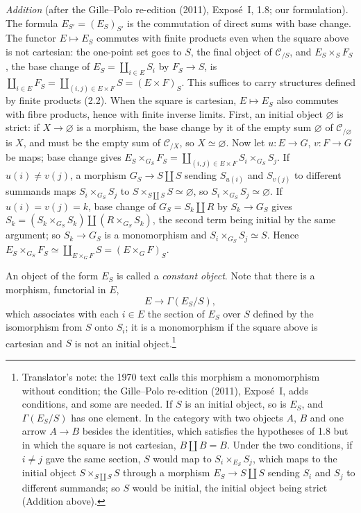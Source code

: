 \par\medskip\noindent
\emph{Addition} (after the Gille--Polo re-edition (2011), Exposé~I, 1.8;
our formulation). The formula \(E_{S'}=(E_S)_{S'}\) is the commutation of
direct sums with base change. The functor \(E\mapsto E_S\) commutes with
finite products even when the square above is not cartesian: the one-point
set goes to \(S\), the final object of \(\mathscr C_{/S}\), and
\(E_S\times_SF_S\), the base change of \(E_S=\coprod_{i\in E}S_i\) by
\(F_S\to S\), is
\(\coprod_{i\in E}F_S=\coprod_{(i,j)\in E\times F}S=(E\times F)_S\). This
suffices to carry structures defined by finite products (2.2). When the
square is cartesian, \(E\mapsto E_S\) also commutes with fibre products,
hence with finite inverse limits. First, an initial object \(\varnothing\)
is strict: if \(X\to\varnothing\) is a morphism, the base change by it of
the empty sum \(\varnothing\) of \(\mathscr C_{/\varnothing}\) is \(X\), and
must be the empty sum of \(\mathscr C_{/X}\), so \(X\simeq\varnothing\).
Now let \(u:E\to G\), \(v:F\to G\) be maps; base change gives
\(E_S\times_{G_S}F_S=\coprod_{(i,j)\in E\times F}S_i\times_{G_S}S_j\). If
\(u(i)\ne v(j)\), a morphism \(G_S\to S\amalg S\) sending \(S_{u(i)}\) and
\(S_{v(j)}\) to different summands maps \(S_i\times_{G_S}S_j\) to
\(S\times_{S\amalg S}S\simeq\varnothing\), so
\(S_i\times_{G_S}S_j\simeq\varnothing\). If \(u(i)=v(j)=k\), base change of
\(G_S=S_k\amalg R\) by \(S_k\to G_S\) gives
\(S_k=(S_k\times_{G_S}S_k)\amalg(R\times_{G_S}S_k)\), the second term being
initial by the same argument; so \(S_k\to G_S\) is a monomorphism and
\(S_i\times_{G_S}S_j\simeq S\). Hence
\(E_S\times_{G_S}F_S\simeq\coprod_{E\times_GF}S=(E\times_GF)_S\).
\par\medskip

An object of the form \(E_S\) is called a \emph{constant object}. Note that
there is a morphism, functorial in \(E\),
\[
  E\longrightarrow\Gamma(E_S/S),
\]
which associates with each \(i\in E\) the section of \(E_S\) over \(S\)
defined by the isomorphism from \(S\) onto \(S_i\); it is a monomorphism if
the square above is cartesian and \(S\) is not an initial
object.\footnote{Translator's note: the 1970 text calls this morphism a
monomorphism without condition; the Gille--Polo re-edition (2011),
Exposé~I, adds conditions, and some are needed. If \(S\) is an initial
object, so is \(E_S\), and \(\Gamma(E_S/S)\) has one element. In the
category with two objects \(A\), \(B\) and one arrow \(A\to B\) besides the
identities, which satisfies the hypotheses of 1.8 but in which the square is
not cartesian, \(B\amalg B=B\). Under the two conditions, if \(i\ne j\) gave
the same section, \(S\) would map to \(S_i\times_{E_S}S_j\), which maps to
the initial object \(S\times_{S\amalg S}S\) through a morphism
\(E_S\to S\amalg S\) sending \(S_i\) and \(S_j\) to different summands; so
\(S\) would be initial, the initial object being strict (Addition above).}

